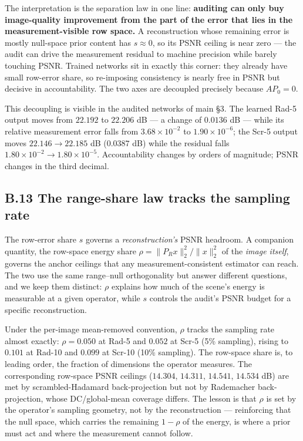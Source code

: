 \documentclass[11pt]{article}
\begin{document}
The interpretation is the separation law in one line: \textbf{auditing can only buy image-quality improvement from the part of the error that lies in the measurement-visible row space.} A reconstruction whose remaining error is mostly null-space prior content has $s \approx 0$, so its PSNR ceiling is near zero --- the audit can drive the measurement residual to machine precision while barely touching PSNR. Trained networks sit in exactly this corner: they already have small row-error share, so re-imposing consistency is nearly free in PSNR but decisive in accountability. The two axes are decoupled precisely because $A P_0 = 0$.

This decoupling is visible in the audited networks of main §3. The learned Rad-5 output moves from $22.192$ to $22.206$ dB --- a change of $0.0136$ dB --- while its relative measurement error falls from $3.68\times10^{-2}$ to $1.90\times10^{-6}$; the Scr-5 output moves $22.146 \to 22.185$ dB ($0.0387$ dB) while the residual falls $1.80\times10^{-2} \to 1.80\times10^{-5}$. Accountability changes by orders of magnitude; PSNR changes in the third decimal.

\subsection*{B.13 The range-share law tracks the sampling rate}

The row-error share $s$ governs a \textit{reconstruction's} PSNR headroom. A companion quantity, the row-space energy share $\rho = \|P_R x\|_2^2 / \|x\|_2^2$ of the \textit{image itself}, governs the anchor ceilings that any measurement-consistent estimator can reach. The two use the same range--null orthogonality but answer different questions, and we keep them distinct: $\rho$ explains how much of the scene's energy is measurable at a given operator, while $s$ controls the audit's PSNR budget for a specific reconstruction.

Under the per-image mean-removed convention, $\rho$ tracks the sampling rate almost exactly: $\rho = 0.050$ at Rad-5 and $0.052$ at Scr-5 (5\% sampling), rising to $0.101$ at Rad-10 and $0.099$ at Scr-10 (10\% sampling). The row-space share is, to leading order, the fraction of dimensions the operator measures. The corresponding row-space PSNR ceilings ($14.304$, $14.311$, $14.541$, $14.534$ dB) are met by scrambled-Hadamard back-projection but not by Rademacher back-projection, whose DC/global-mean coverage differs. The lesson is that $\rho$ is set by the operator's sampling geometry, not by the reconstruction --- reinforcing that the null space, which carries the remaining $1-\rho$ of the energy, is where a prior must act and where the measurement cannot follow.
\end{document}
